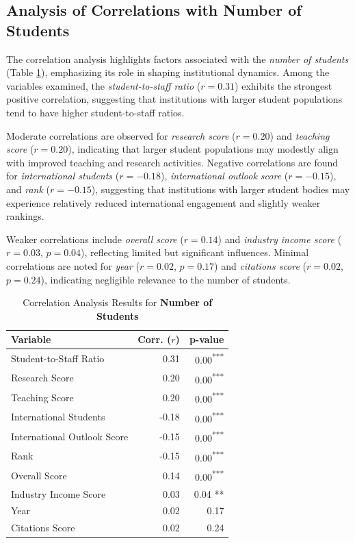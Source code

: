 \documentclass[conference]{IEEEtran}
\begin{document}
\subsection{Analysis of Correlations with Number of Students}

The correlation analysis highlights factors associated with the \textit{number of students} (Table \ref{tab:correlation_number_students}), emphasizing its role in shaping institutional dynamics. Among the variables examined, the \textit{student-to-staff ratio} ($r = 0.31$) exhibits the strongest positive correlation, suggesting that institutions with larger student populations tend to have higher student-to-staff ratios.

Moderate correlations are observed for \textit{research score} ($r = 0.20$) and \textit{teaching score} ($r = 0.20$), indicating that larger student populations may modestly align with improved teaching and research activities. Negative correlations are found for \textit{international students} ($r = -0.18$), \textit{international outlook score} ($r = -0.15$), and \textit{rank} ($r = -0.15$), suggesting that institutions with larger student bodies may experience relatively reduced international engagement and slightly weaker rankings.

Weaker correlations include \textit{overall score} ($r = 0.14$) and \textit{industry income score} ($r = 0.03$, $p = 0.04$), reflecting limited but significant influences. Minimal correlations are noted for \textit{year} ($r = 0.02$, $p = 0.17$) and \textit{citations score} ($r = 0.02$, $p = 0.24$), indicating negligible relevance to the number of students.

\begin{table}[h!]
	\centering
	\caption{Correlation Analysis Results for \textbf{Number of Students}}
	\label{tab:correlation_number_students}
	\begin{tabular}{|l|r|r|}
		\hline
		\textbf{Variable} & \textbf{Corr. ($r$)} & \textbf{p-value} \\
		\hline
		Student-to-Staff Ratio & 0.31 & 0.00\textsuperscript{***} \\
		Research Score & 0.20 & 0.00\textsuperscript{***} \\
		Teaching Score & 0.20 & 0.00\textsuperscript{***} \\
		International Students & -0.18 & 0.00\textsuperscript{***} \\
		International Outlook Score & -0.15 & 0.00\textsuperscript{***} \\
		Rank & -0.15 & 0.00\textsuperscript{***} \\
		Overall Score & 0.14 & 0.00\textsuperscript{***} \\
		Industry Income Score & 0.03 & 0.04 ** \\
		Year & 0.02 & 0.17 \\
		Citations Score & 0.02 & 0.24 \\
		\hline
	\end{tabular}
\end{table}
\end{document}
